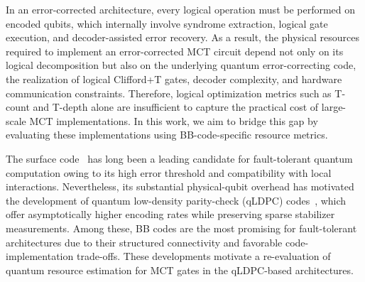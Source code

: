 \documentclass[sigconf]{acmart}
\newcommand{\anik}[1]{%
        \textcolor{blue}{\textbf{Anik:} #1}%
    }
\newcommand{\siyi}[1]{%
        \textcolor{cyan}{\textbf{Siyi:} #1}%
    }
\newcommand{\anik}[1]{}
\newcommand{\siyi}[1]{}
\begin{document}
In an error-corrected architecture, every logical operation must be performed on encoded qubits, which internally involve syndrome extraction, logical gate execution, and decoder-assisted error recovery. As a result, the physical resources required to implement an error-corrected MCT circuit depend not only on its logical decomposition but also on the underlying quantum error-correcting code, the realization of logical Clifford+T gates, decoder complexity, and hardware communication constraints. Therefore, logical optimization metrics such as T-count and T-depth alone are insufficient to capture the practical cost of large-scale MCT implementations. In this work, we aim to bridge this gap by evaluating these implementations using BB-code-specific resource metrics.

The surface code~\cite{surface-code} has long been a leading candidate for fault-tolerant quantum computation owing to its high error threshold and compatibility with local interactions. Nevertheless, its substantial physical-qubit overhead has motivated the development of quantum low-density parity-check (qLDPC) codes~\cite{qLDPC}, which offer asymptotically higher encoding rates while preserving sparse stabilizer measurements. Among these, BB codes are the most promising for fault-tolerant architectures due to their structured connectivity and favorable code-implementation trade-offs. These developments motivate a re-evaluation of quantum resource estimation for MCT gates in the qLDPC-based architectures.


\end{document}
